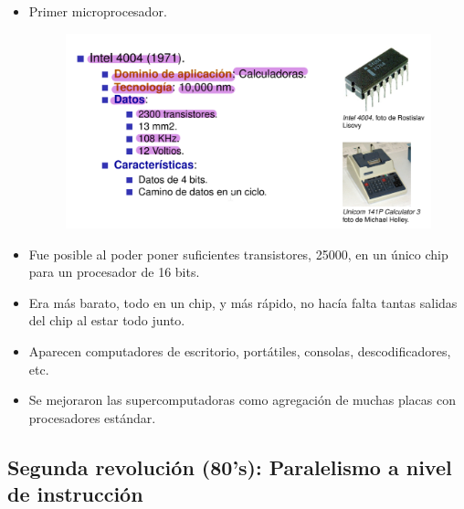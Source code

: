 \documentclass[12pt, twoside, openright]{report} %
\begin{document}
    \begin{itemize}
    \item
      Primer microprocesador.
      \begin{figure}[H]
        {\includegraphics[scale=.25]{Untitled 2.png}}
      \end{figure}
    \item
      Fue posible al poder poner suficientes transistores, 25000, en un
      único chip para un procesador de 16 bits.
    \item
      Era más barato, todo en un chip, y más rápido, no hacía falta
      tantas salidas del chip al estar todo junto.
    \item
      Aparecen computadores de escritorio, portátiles, consolas,
      descodificadores, etc.
    \item
      Se mejoraron las supercomputadoras como agregación de muchas
      placas con procesadores estándar.
    \end{itemize}
  
    \subsection{Segunda revolución (80's): Paralelismo a nivel de instrucción}
\end{document}
